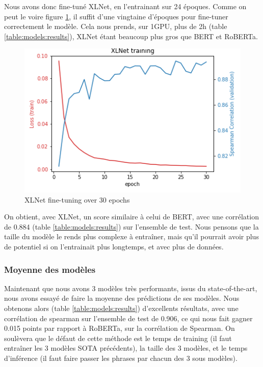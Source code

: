 \documentclass[11pt,a4paper, french]{article}
\begin{document}
Nous avons donc fine-tuné XLNet, en l'entrainant sur 24 époques. Comme on peut le voire figure \ref{fig:XLNet:finetunning}, il suffit d'une vingtaine d'époques pour fine-tuner correctement le modèle. Cela nous prends, sur 1GPU, plus de 2h (table \ref{table:models:results}), XLNet étant beaucoup plus gros que BERT et RoBERTa.

\begin{figure}
  \includegraphics[width=\linewidth]{resources/xlnet-training.png}
  \caption{XLNet fine-tuning over 30 epochs}
  \label{fig:XLNet:finetunning}
\end{figure}

On obtient, avec XLNet, un score similaire à celui de BERT, avec une corrélation de 0.884 (table \ref{table:models:results}) sur l'ensemble de test. Nous pensons que la taille du modèle le rends plus complexe à entraîner, mais qu'il pourrait avoir plus de potentiel si on l'entrainait plus longtemps, et avec plus de données.

%
\subsubsection{Moyenne des modèles}

Maintenant que nous avons 3 modèles très performants, issus du state-of-the-art, nous avons essayé de faire la moyenne des prédictions de ses modèles. Nous obtenons alors (table \ref{table:models:results}) d'excellents résultats, avec une corrélation de spearman sur l'ensemble de test de 0.906, ce qui nous fait gagner 0.015 points par rapport à RoBERTa, sur la corrélation de Spearman. On soulèvera que le défaut de cette méthode est le temps de training (il faut entraîner les 3 modèles SOTA précédents), la taille des 3 modèles, et le temps d'inférence (il faut faire passer les phrases par chacun des 3 sous modèles).
\end{document}
